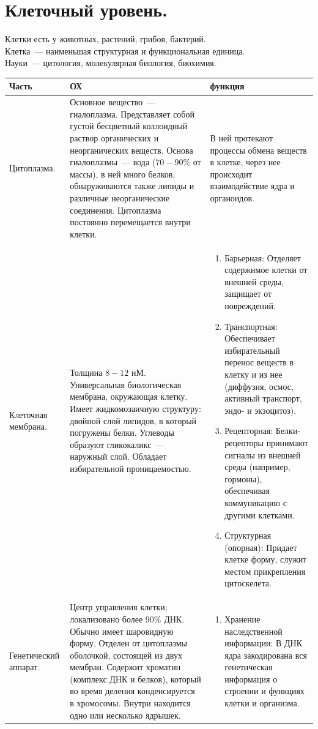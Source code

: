 \documentclass[12pt]{article}
\begin{document}
	\section{Клеточный уровень.}
	Клетки есть у животных, растений, грибов, бактерий. \\
	Клетка~--- наименьшая структурная и функциональная единица. \\
	Науки~--- цитология, молекулярная биология, биохимия. \\
	\begin{xltabular}{\textwidth}{|X|X|X|}
		\hline
		Часть & ОХ & функция \\
		\hline
		Цитоплазма. & Основное вещество~--- гиалоплазма. Представляет собой густой бесцветный коллоидный раствор органических и неорганических веществ. Основа гиалоплазмы~--- вода ($70-90\%$ от массы), в ней много белков, обнаруживаются также липиды и различные неорганические соединения. Цитоплазма постоянно перемещается внутри клетки. & В ней протекают процессы обмена веществ в клетке, через нее происходит взаимодействие ядра и органоидов. \\
		\hline 
		Клеточная мембрана. & Толщина $8-12$ нМ. Универсальная биологическая мембрана, окружающая клетку. Имеет жидкомозаичную структуру: двойной слой липидов, в который погружены белки. Углеводы образуют гликокаликс~--- наружный слой. Обладает избирательной проницаемостью. & \begin{enumerate}
			\item Барьерная: Отделяет содержимое клетки от внешней среды, защищает от повреждений.
			\item Транспортная: Обеспечивает избирательный перенос веществ в клетку и из нее (диффузия, осмос, активный транспорт, эндо- и экзоцитоз).
			\item Рецепторная: Белки-рецепторы принимают сигналы из внешней среды (например, гормоны), обеспечивая коммуникацию с другими клетками.
			\item Структурная (опорная): Придает клетке форму, служит местом прикрепления цитоскелета.
		\end{enumerate} \\
		\hline
		Генетический аппарат. & Центр управления клетки; локализовано более $90\%$ ДНК. Обычно имеет шаровидную форму. Отделен от цитоплазмы оболочкой, состоящей из двух мембран. Содержит хроматин (комплекс ДНК и белков), который во время деления конденсируется в хромосомы. Внутри находится одно или несколько ядрышек. & \begin{enumerate}
			\item Хранение наследственной информации: В ДНК ядра закодирована вся генетическая информация о строении и функциях клетки и организма.

\end{enumerate}
\end{xltabular}
\end{document}
